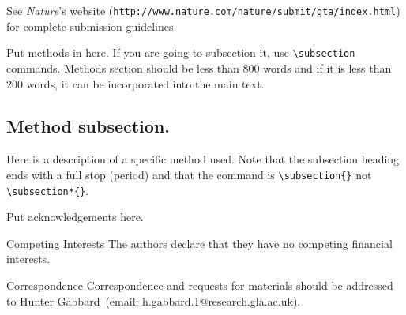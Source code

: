 \documentclass{nature}
\begin{document}
See \textsl{Nature}'s website
(\texttt{http://www.nature.com/nature/submit/gta/index.html}) for
complete submission guidelines.

\begin{methods}
Put methods in here.  If you are going to subsection it, use
\verb|\subsection| commands.  Methods section should be less than
800 words and if it is less than 200 words, it can be incorporated
into the main text.

\subsection{Method subsection.}

Here is a description of a specific method used.  Note that the
subsection heading ends with a full stop (period) and that the
command is \verb|\subsection{}| not \verb|\subsection*{}|.

\end{methods}








\begin{addendum}
 \item Put acknowledgements here.
 \item[Competing Interests] The authors declare that they have no
competing financial interests.
 \item[Correspondence] Correspondence and requests for materials
should be addressed to Hunter Gabbard~(email: h.gabbard.1@research.gla.ac.uk).
\end{addendum}
\end{document}

